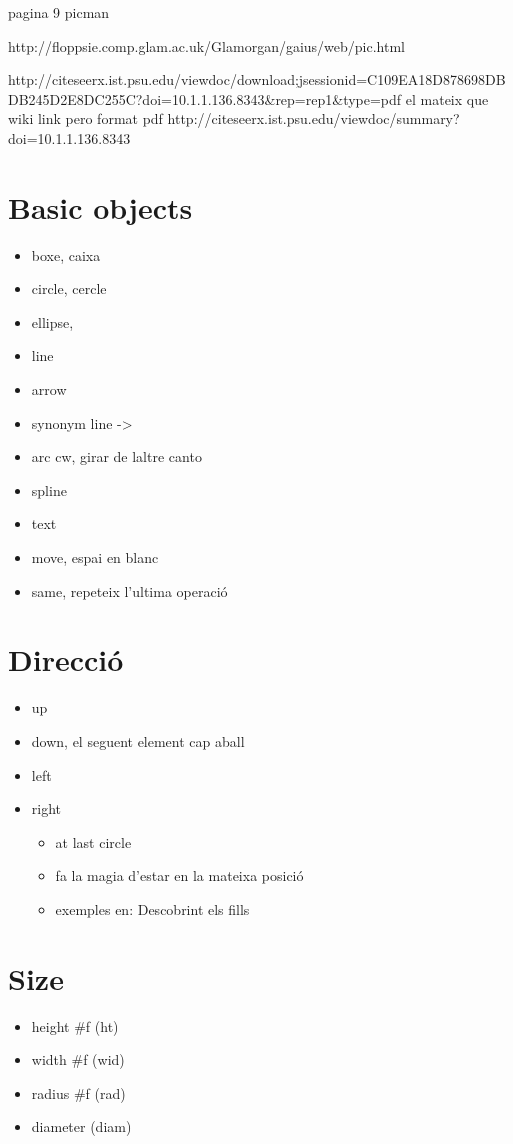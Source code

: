 pagina 9 picman

http://floppsie.comp.glam.ac.uk/Glamorgan/gaius/web/pic.html

http://citeseerx.ist.psu.edu/viewdoc/download;jsessionid=C109EA18D878698DBDB245D2E8DC255C?doi=10.1.1.136.8343&rep=rep1&type=pdf
	el mateix que wiki link pero format pdf
	http://citeseerx.ist.psu.edu/viewdoc/summary?doi=10.1.1.136.8343

\section{Basic objects}
\begin{itemize}
\item boxe, caixa
\item circle, cercle
\item ellipse, 
\item line
	\subitem <->
\item arrow
	\item synonym line ->
\item arc
	\subitem cw, girar de laltre canto
\item spline
\item text
\item move, espai en blanc
\item same, repeteix l'ultima operació
\end{itemize}

\section{Direcció}
\begin{itemize}
\item up
\item down, el seguent element cap aball
\item left
\item right
	\begin{itemize}
	\item at last circle
	\item fa la magia d'estar en la mateixa posició
	\item exemples en: Descobrint els fills
	\end{itemize}
\end{itemize}

\section{Size}
\begin{itemize}
\item height #f (ht)
\item width #f (wid)
\item radius #f (rad)
\item diameter (diam)
\end{itemize}

